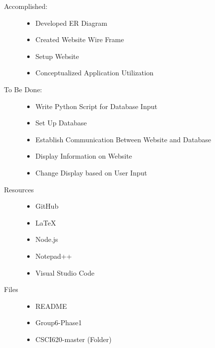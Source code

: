 \documentclass{Group6_Phase1}
\begin{document}
\begin{description}
	\item[Accomplished:] \hfill
	\begin{itemize}
		\item Developed ER Diagram
		\item Created Website Wire Frame
		\item Setup Website
		\item Conceptualized Application Utilization
	\end{itemize}
	
	\item[To Be Done:] \hfill
	\begin{itemize}
		\item Write Python Script for Database Input
		\item Set Up Database
		\item Establish Communication Between Website and Database
		\item Display Information on Website
		\item Change Display based on User Input
	\end{itemize}
	
	\item[Resources] \hfill
	\begin{itemize}
		\item GitHub
		\item LaTeX
		\item Node.js
		\item Notepad++
		\item Visual Studio Code
	\end{itemize}
	
	\item[Files] \hfill
	\begin{itemize}
		\item README
		\item Group6-Phase1
		\item CSCI620-master (Folder)
	\end{itemize}
\end{description}
\end{document}
